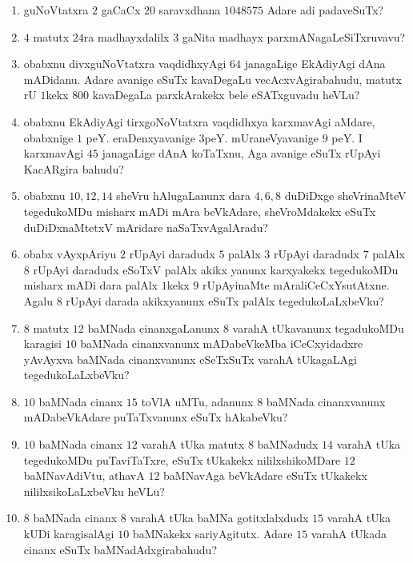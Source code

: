 \begin{enumerate}
\item guNoVtatxra $2$ gaCaCx $20$ saravxdhana $1048575$ Adare adi
padaveSuTx?

\item $4$ matutx $24$ra madhayxdalilx $3$ gaNita madhayx
parxmANagaLeSiTxruvavu?

\item obabxnu divxguNoVtatxra vaqdidhxyAgi $64$ janagaLige EkAdiyAgi
dAna mADidanu. Adare avanige eSuTx kavaDegaLu vecAcxvAgirabahudu,
matutx rU $1$kekx $800$ kavaDegaLa parxkArakekx bele eSATxguvadu
heVLu?

\item obabxnu EkAdiyAgi tirxgoNoVtatxra vaqdidhxya karxmavAgi aMdare,
obabxnige $1$ peY. eraDenxyavanige $3$peY. mUraneVyavanige $9$ peY. I
karxmavAgi $45$ janagaLige dAnA koTaTxnu, Aga avanige eSuTx rUpAyi
KacARgira bahudu?

\item obabxnu $10, 12, 14$ sheVru hAlugaLanunx dara $4, 6, 8$ duDiDxge
sheVrinaMteV tegedukoMDu misharx mADi mAra beVkAdare, sheVroMdakekx
eSuTx duDiDxnaMtetxV mAridare naSaTxvAgalAradu?

\item obabx vAyxpAriyu $2$ rUpAyi daradudx $5$ palAlx $3$ rUpAyi
daradudx $7$ palAlx $8$ rUpAyi daradudx eSoTxV palAlx akikx yanunx
karxyakekx tegedukoMDu misharx mADi dara palAlx $1$kekx $9$
rUpAyinaMte mAraliCeCxYsutAtxne. Agalu $8$ rUpAyi darada akikxyanunx
eSuTx palAlx tegedukoLaLxbeVku?

\item $8$ matutx $12$ baMNada cinanxgaLanunx $8$ varahA tUkavanunx
tegadukoMDu karagisi $10$ baMNada cinanxvanunx mADa\-beVkeMba
iCeCxyidadxre yAvAyxva baMNada cinanxvanunx eSeTxSuTx varahA
tUkagaLAgi tegedukoLaLxbeVku?

\item $10$ baMNada cinanx $15$ toVlA uMTu, adanunx $8$ baMNada
cinanxvanunx mADabeVkAdare puTaTxvanunx eSuTx hAkabeVku?

\item $10$ baMNada cinanx $12$ varahA tUka matutx $8$ baMNadudx $14$
varahA tUka tegedukoMDu puTaviTaTxre, eSuTx tUkakekx nililxshikoMDare
$12$ baMNavAdiVtu, athavA $12$ baMNavAga beVkAdare eSuTx tUkakekx
nililxsikoLaLxbeVku heVLu?

\item $8$ baMNada cinanx $8$ varahA tUka baMNa gotitxlalxdudx $15$
varahA tUka kUDi karagisalAgi $10$ baMNakekx sariyAgitutx. Adare $15$
varahA tUkada cinanx eSuTx baMNadAdxgirabahudu?


\end{enumerate}
